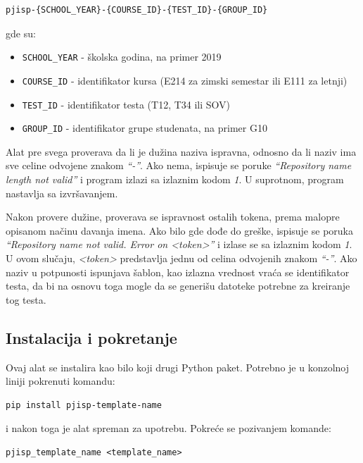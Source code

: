 \documentclass[12pt]{report}
\begin{document}
\begin{verbatim}
pjisp-{SCHOOL_YEAR}-{COURSE_ID}-{TEST_ID}-{GROUP_ID}
\end{verbatim}

gde su:

\begin{itemize}
    \item \texttt{{SCHOOL\_YEAR}} - školska godina, na primer 2019
    \item \texttt{{COURSE\_ID}} - identifikator kursa (E214 za zimski semestar ili E111 za letnji)
    \item \texttt{{TEST\_ID}} - identifikator testa (T12, T34 ili SOV)
    \item \texttt{{GROUP\_ID}} - identifikator grupe studenata, na primer G10
\end{itemize}

Alat pre svega proverava da li je dužina naziva ispravna, odnosno da li naziv ima sve celine odvojene znakom \textit{``-''}. Ako nema, ispisuje se poruke \textit{``Repository name length not valid''} i program izlazi sa izlaznim kodom \textit{1}. U suprotnom, program nastavlja sa izvršavanjem.

Nakon provere dužine, proverava se ispravnost ostalih tokena, prema malopre opisanom načinu davanja imena. Ako bilo gde dođe do greške, ispisuje se poruka  \textit{``Repository name not valid. Error on <token>''} i izlase se sa izlaznim kodom \textit{1}. U ovom slučaju, \textit{<token>} predstavlja jednu od celina odvojenih znakom \textit{``-''}. Ako naziv u potpunosti ispunjava šablon, kao izlazna vrednost vraća se identifikator testa, da bi na osnovu toga mogle da se generišu datoteke potrebne za kreiranje tog testa.

\subsection{Instalacija i pokretanje}
Ovaj alat se instalira kao bilo koji drugi Python paket. Potrebno je u konzolnoj liniji pokrenuti komandu:

\begin{verbatim}
pip install pjisp-template-name
\end{verbatim}

i nakon toga je alat spreman za upotrebu. Pokreće se pozivanjem komande:

\begin{verbatim}
pjisp_template_name <template_name>
\end{verbatim}
\end{document}
